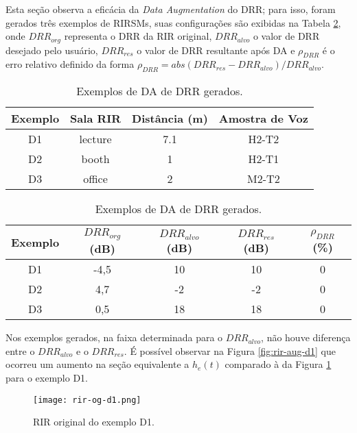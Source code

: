 Esta seção observa a eficácia da \textit{Data Augmentation} do DRR; para isso, foram gerados três exemplos de RIRSMs, suas configurações
são exibidas na Tabela \ref{tbl:da-drr}, onde $DRR_{org}$ representa o DRR da RIR original, $DRR_{alvo}$ o valor de DRR desejado pelo usuário,
$DRR_{res}$ o valor de DRR resultante após DA e $\rho_{DRR}$ é o erro relativo definido da forma $\rho_{DRR} = abs(DRR_{res} - DRR_{alvo})/DRR_{alvo}$.

\begin{table} [H]
    \centering
    \caption{Exemplos de DA de DRR gerados.}
    \label{tbl:da-drr}
    \begin{tabular}{c|c|c|c}

        \textbf{Exemplo} & 
        \textbf{Sala RIR} & 
        \textbf{Distância (m)} &
        \textbf{Amostra de Voz} \\
        \hline 

        D1 & lecture & 7.1 & H2-T2 \\
        D2 & booth & 1 & H2-T1 \\
        D3 & office & 2 & M2-T2 \\

    \end{tabular}
    \bigbreak
    \bigbreak
    \begin{tabular}{c|c|c|c|c}

        \textbf{Exemplo} & 
        \textbf{$DRR_{org}$ (dB)} & 
        \textbf{$DRR_{alvo}$ (dB)} &
        \textbf{$DRR_{res}$ (dB)} & 
        \textbf{$\rho_{DRR}$ (\%)} \\
        \hline 

        D1 & -4,5 & 10 & 10 & 0 \\
        D2 & 4,7 & -2 & -2 & 0 \\
        D3 & 0,5 & 18 & 18 & 0 \\

    \end{tabular}
\end{table}


Nos exemplos gerados, na faixa determinada para o $DRR_{alvo}$, não houve diferença entre o $DRR_{alvo}$ e o $DRR_{res}$.
É possível observar na Figura \ref{fig:rir-aug-d1} que ocorreu um aumento na seção equivalente a $h_e(t)$ comparado à da Figura \ref{fig:rir-og-d1}
para o exemplo D1.

\begin{figure} [H]
    \centering
    \texttt{[image: rir-og-d1.png]}
    \caption{RIR original do exemplo D1.}
    \label{fig:rir-og-d1}
\end{figure} 

